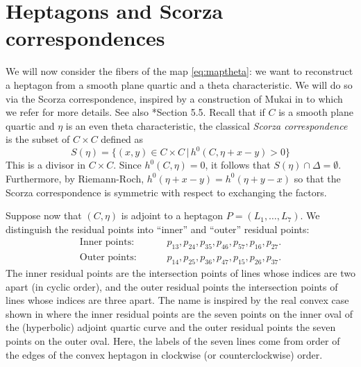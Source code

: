 \documentclass[12pt]{article}
\numberwithin{equation}{section}
\theoremstyle{definition}
\begin{document}
\section{Heptagons and Scorza correspondences}\label{sec:scorza} 

We will now consider the fibers of the map \eqref{eq:maptheta}: we want to reconstruct a heptagon from a smooth plane quartic and a theta characteristic. We will do so via the Scorza correspondence, inspired by a construction of Mukai in \cite{Mukai} to which we refer for more details. See also \cite{Dolgachev}*{Section 5.5}. Recall that if $C$ is a smooth plane quartic and $\eta$ is an even theta characteristic, the classical \emph{Scorza correspondence} is the subset of $C\times C$ defined as
\[ S(\eta) = \{ (x,y) \in C\times C \,|\, h^0(C,\eta+x-y)>0 \} \]
This is a divisor in $C\times C$. Since $h^0(C,\eta)=0$, it follows that $S(\eta)\cap \Delta = \emptyset$. Furthermore, by Riemann-Roch, $h^0(\eta+x-y)=h^0(\eta+y-x)$ so that the Scorza correspondence is symmetric with respect to exchanging the factors.

Suppose now that $(C,\eta)$ is adjoint to a heptagon $P=(L_1,\dots,L_7)$. We distinguish the residual points into ``inner'' and ``outer'' residual points:
\begin{align*}
\text{Inner  points: } & \qquad p_{13}, p_{24}, p_{35}, p_{46}, p_{57}, p_{16}, p_{27}. \\
\text{Outer  points: } & \qquad p_{14}, p_{25}, p_{36}, p_{47}, p_{15}, p_{26}, p_{37}.
\end{align*}
The inner residual points are the intersection points of lines whose indices are two apart (in cyclic order), and the outer residual points the intersection points of lines whose indices are three apart. The name is inspired by the real convex case shown in  where the inner residual points are the seven points on the inner oval of the (hyperbolic) adjoint quartic curve and the outer residual points the seven points on the outer oval. Here, the labels of the seven lines come from order of the edges of the convex heptagon in clockwise (or counterclockwise) order. 
\end{document}
